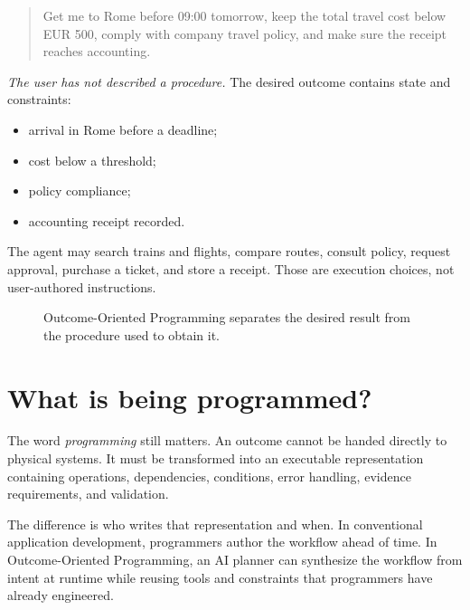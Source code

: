 \documentclass[10pt,oneside,openany]{book}
\begin{document}
\begin{quote}
Get me to Rome before 09:00 tomorrow, keep the total travel cost below EUR 500, comply with company travel policy, and make sure the receipt reaches accounting.
\end{quote}

\emph{The user has not described a procedure.} The desired outcome contains state and constraints:

\begin{itemize}
\item arrival in Rome before a deadline;
\item cost below a threshold;
\item policy compliance;
\item accounting receipt recorded.
\end{itemize}

The agent may search trains and flights, compare routes, consult policy, request approval, purchase a ticket, and store a receipt. Those are execution choices, not user-authored instructions.

\begin{figure}[ht]
\centering
{}
\caption{Outcome-Oriented Programming separates the desired result from the procedure used to obtain it.}
\end{figure}

\section{What is being programmed?}
The word \emph{programming} still matters. An outcome cannot be handed directly to physical systems. It must be transformed into an executable representation containing operations, dependencies, conditions, error handling, evidence requirements, and validation.

The difference is who writes that representation and when. In conventional application development, programmers author the workflow ahead of time. In Outcome-Oriented Programming, an AI planner can synthesize the workflow from intent at runtime while reusing tools and constraints that programmers have already engineered.
\end{document}
